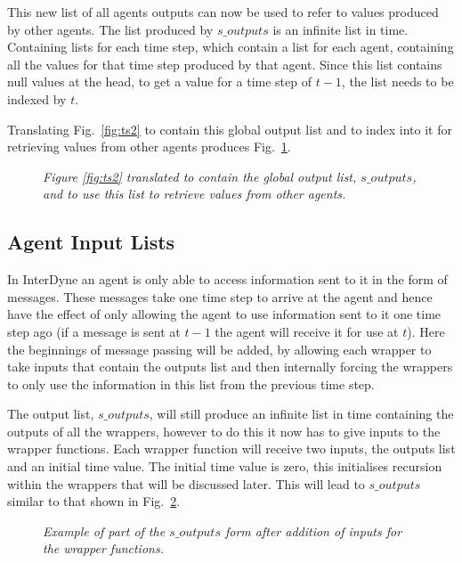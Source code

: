 \documentclass{article}
\begin{document}
This new list of all agents outputs can now be used to refer to values produced by other agents. The list produced by $s\_outputs$ is an infinite list in time. Containing lists for each time step, which contain a list for each agent, containing all the values for that time step produced by that agent. Since this list contains null values at the head, to get a value for a time step of $t-1$, the list needs to be indexed by $t$.

Translating Fig.~\ref{fig:ts2} to contain this global output list and to index into it for retrieving values from other agents produces Fig.~\ref{fig:ts3}.
\begin{figure}[H]
	\centering
	
	\caption{\it  Figure \ref{fig:ts2} translated to contain the global output list, $s\_outputs$, and to use this list to retrieve values from other agents.}
	\label{fig:ts3}
\end{figure} 


\subsection{Agent Input Lists}
In InterDyne an agent is only able to access information sent to it in the form of messages. These messages take one time step to arrive at the agent and hence have the effect of only allowing the agent to use information sent to it one time step ago (if a message is sent at $t-1$ the agent will receive it for use at $t$). Here the beginnings of message passing will be added, by allowing each wrapper to take inputs that contain the outputs list and then internally forcing the wrappers to only use the information in this list from the previous time step. 

The output list, $s\_outputs$, will still produce an infinite list in time containing the outputs of all the wrappers, however to do this it now has to give inputs to the wrapper functions. Each wrapper function will receive two inputs, the outputs list and an initial time value. The initial time value is zero, this initialises recursion within the wrappers that will be discussed later.  This will lead to $s\_outputs$ similar to that shown in Fig.~\ref{fig:souts4}.
\begin{figure}[H]
	\centering
	
	\caption{\it Example of part of the $s\_outputs$ form after addition of inputs for the wrapper functions.}
	\label{fig:souts4}
\end{figure} 
\end{document}

